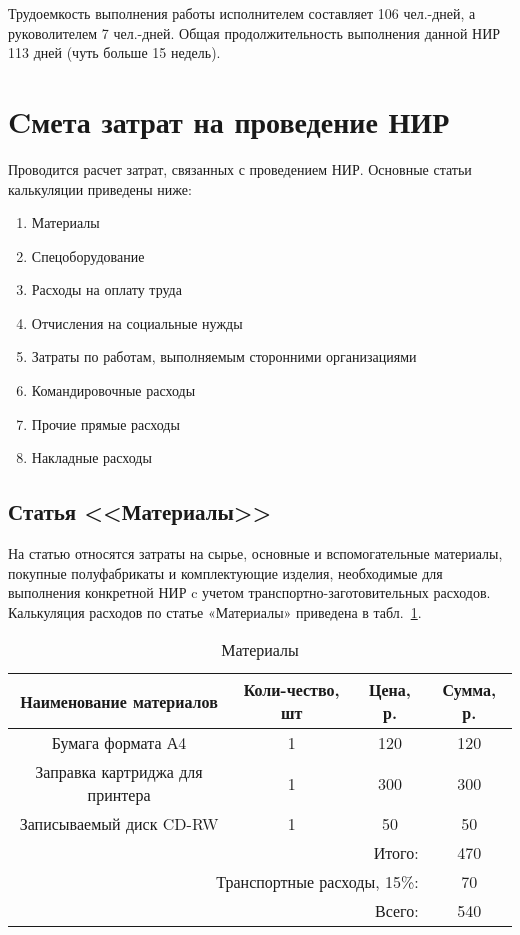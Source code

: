 Трудоемкость выполнения работы исполнителем  составляет 106 чел.-дней, а руковолителем 7 чел.-дней.
Общая продолжительность выполнения данной НИР 113 дней (чуть больше 15 недель).

\section{Cмета затрат на проведение НИР}

Проводится расчет затрат, связанных с проведением НИР. Основные статьи калькуляции приведены ниже:
\begin{enumerate}
\item Материалы
\item Спецоборудование
\item Расходы на оплату труда
\item Отчисления на социальные нужды
\item Затраты по работам, выполняемым сторонними организациями
\item Командировочные расходы
\item Прочие прямые расходы
\item Накладные расходы
\end{enumerate}

\subsection{Статья <<Материалы>>}

На статью относятся затраты на сырье, основные и вспомогательные материалы, покупные  полуфабрикаты
и комплектующие изделия, необходимые для выполнения конкретной НИР c учетом транспортно-заготовительных
расходов. Калькуляция расходов по статье «Материалы» приведена в табл.~\ref{tab:material}.

\begin{table}[ht]
\caption{Материалы}
\begin{tabular}{|c|c|c|c|}
\hline
Наименование материалов&Коли-чество, шт&Цена, р.&Сумма, р.\\
\hline
Бумага формата А4&1&120&120\\
\hline
Заправка картриджа для принтера&1&300&300\\
\hline
Записываемый диск CD-RW&1&50&50\\
\hline
\multicolumn{3}{|r|}{Итого:}&470\\
\hline
\multicolumn{3}{|r|}{Транспортные расходы, 15\%:}&70\\
\hline
\multicolumn{3}{|r|}{Всего:}&540\\
\hline
\end{tabular}
\label{tab:material}
\end{table}

